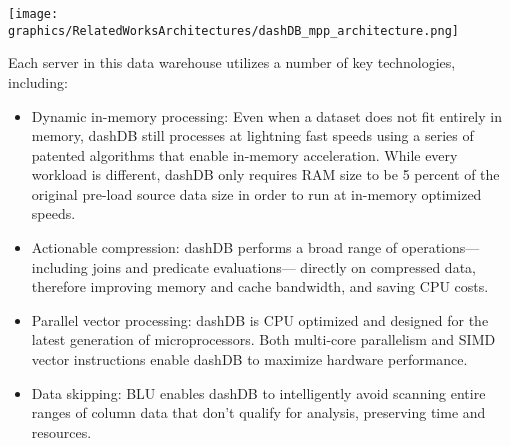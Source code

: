 \documentclass[letterpaper, 12pt]{article}
\renewcommand{\includegraphics}[2][]{\fbox{}}
\begin{document}
\begin{itemize}
	  \par\vspace{\baselineskip}
	\texttt{[image: graphics/RelatedWorksArchitectures/dashDB\_mpp\_architecture.png]}
	  \cite{dashDB}
	  \par\vspace{\baselineskip}
	  Each server in this data warehouse utilizes a number of key technologies, including: 
	  \begin{itemize}
	    \item Dynamic in-memory processing: Even when a dataset
	    does not fit entirely in memory, dashDB still processes at
	    lightning fast speeds using a series of patented algorithms
	    that enable in-memory acceleration. While every workload
	    is different, dashDB only requires RAM size to be 5 percent
	    of the original pre-load source data size in order to run at
        in-memory optimized speeds.
        \item Actionable compression: dashDB performs a broad range
	    of operations—including joins and predicate evaluations—
	    directly on compressed data, therefore improving memory
	    and cache bandwidth, and saving CPU costs.
   	   \item Parallel vector processing: dashDB is CPU optimized
	   and designed for the latest generation of microprocessors.
	   Both multi-core parallelism and SIMD vector instructions
       enable dashDB to maximize hardware performance.
	   \item Data skipping: BLU enables dashDB to intelligently avoid
	   scanning entire ranges of column data that don’t qualify for
	   analysis, preserving time and resources.
	 \end{itemize}
	

\end{itemize}
\end{document}
